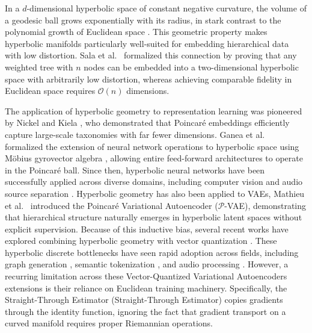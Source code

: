 \documentclass[12pt]{report}
\begin{document}
 In a $d$-dimensional hyperbolic space of constant negative curvature, the volume of a geodesic ball grows exponentially with its radius, in stark contrast to the polynomial growth of Euclidean space \cite{cannon1997hyperbolic}. This geometric property makes hyperbolic manifolds particularly well-suited for embedding hierarchical data with low distortion. Sala et al.\ \cite{sala2018representation} formalized this connection by proving that any weighted tree with $n$ nodes can be embedded into a two-dimensional hyperbolic space with arbitrarily low distortion, whereas achieving comparable fidelity in Euclidean space requires $\mathcal{O}(n)$ dimensions.

The application of hyperbolic geometry to representation learning was pioneered by Nickel and Kiela \cite{nickel2017poincare}, who demonstrated that Poincar\'e embeddings efficiently capture large-scale taxonomies with far fewer dimensions. Ganea et al.\ \cite{ganea2018hyperbolic} formalized the extension of neural network operations to hyperbolic space using M\"obius gyrovector algebra \cite{ungar2009gyrovector}, allowing entire feed-forward architectures to operate in the Poincar\'e ball. Since then, hyperbolic neural networks have been successfully applied across diverse domains, including computer vision \cite{khrulkov2020hyperbolic, atigh2022hyperbolic, mettes2024hyperbolic} and audio source separation \cite{petermann2023hyperbolic}. Hyperbolic geometry has also been applied to VAEs, Mathieu et al.\ \cite{mathieu2019poincare} introduced the Poincar\'e Variational Autoencoder ($\mathcal{P}$-VAE), demonstrating that hierarchical structure naturally emerges in hyperbolic latent spaces without explicit supervision. Because of this inductive bias, several recent works have explored combining hyperbolic geometry with vector quantization \cite{hypervq, hvqvae}. These hyperbolic discrete bottlenecks have seen rapid adoption across fields, including graph generation \cite{bu2025ggball}, semantic tokenization \cite{yao2026zeroshot, wang2026varlenrec}, and audio processing \cite{girish2026prosody}. However, a recurring limitation across these Vector-Quantized Variational Autoencoders extensions is their reliance on Euclidean training machinery. Specifically, the Straight-Through Estimator (Straight-Through Estimator) copies gradients through the identity function, ignoring the fact that gradient transport on a curved manifold requires proper Riemannian operations.
\end{document}
